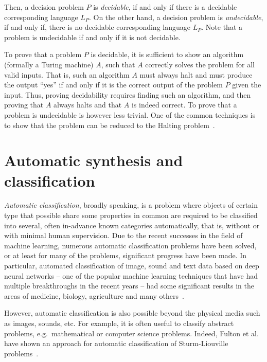 Then, a decision problem $P$ is \emph{decidable}, if and only if
there is a decidable corresponding language $L_P$.
On the other hand, a decision problem is \emph{undecidable},
if and only if, there is no decidable corresponding language $L_P$.
Note that a problem is undecidable if and only if it is not
decidable.

To prove that a problem $P$ is decidable, it is sufficient to
show an algorithm (formally a Turing machine) $A$, such that
$A$ correctly solves the problem for all valid inputs. That is,
such an algorithm $A$ must always halt and must produce the
output ``yes'' if and only if it is the correct output of the
problem $P$ given the input. Thus, proving decidability
requires finding such an algorithm, and then proving
that $A$ always halts and that $A$ is indeed correct.
To prove that a problem is undecidable is however less
trivial. One of the common techniques is to show that
the problem can be reduced to the Halting problem~\cite{Margenstern2000, Turing1937}.

\section{Automatic synthesis and classification}

\emph{Automatic classification}, broadly speaking, is a problem
where objects of certain type that possible share some
properties in common are required to be classified into
several, often in-advance known categories automatically,
that is, without or with minimal human supervision.
Due to the recent successes in the field of machine learning,
numerous automatic classification problems have been solved,
or at least for many of the problems, significant
progress have been made. In particular, automated classification
of image, sound and text data
based on deep neural networks -- one of the popular machine learning
techniques that have had multiple breakthroughs in the recent years --
had some significant results in the areas of medicine, biology,
agriculture and many others~\cite{auto-class_Sharma2017,
auto-class_Capizzi2015, auto-class_Ibrahim2018, auto-class_Colonna2016,
auto-class_Winkler2017, auto-class_FabioDelFrate}.

However, automatic classification is also possible beyond
the physical media such as images, sounds, etc. For example,
it is often useful to classify abstract problems, e.g.\ mathematical
or computer science problems. Indeed,
Fulton et al.~\cite{class_Fulton} have shown an approach
for automatic classification of Sturm-Liouville
problems~\cite{zettl2010sturm}.

